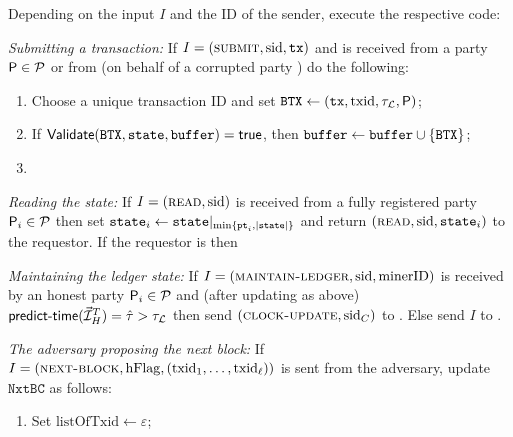 \begin{cccFunctionality}
\begin{cccEnum}
		\item Depending on the input $I$ and the ID of the sender, execute the respective code:
		\begin{cccItemize}[nosep]
			\item \emph{Submitting a transaction:}
			If $I = (\textsc{submit}, \mathrm{sid}, \mathtt{tx})$ and is received from a party $\mathsf{P} \in \mathcal{P}$ or from \adv (on behalf of a corrupted party \party) do the following:
			\begin{enumerate}[label=(\alph*), leftmargin=*, nosep]
				\item Choose a unique transaction ID \txid and set $\mathtt{BTX} \gets (\mathtt{tx}, \mathrm{txid}, \tau_\mathcal{L}, \mathsf{P})$;

				\item If $\mathsf{Validate}(\mathtt{BTX}, \mathtt{state}, \mathtt{buffer}) = \mathsf{true}$, then $\mathtt{buffer} \gets \mathtt{buffer} \cup \{ \mathtt{BTX} \}$;

				\item {}
			\end{enumerate}

			\item \emph{Reading the state:}
			If $I = (\textsc{read}, \mathrm{sid})$ is received from a fully registered party $\mathsf{P}_i \in \mathcal{P}$ then set $\mathtt{state}_i \gets \mathtt{state}|_{\min\{\mathtt{pt}_i, |\mathtt{state}|\}}$ and return $(\textsc{read}, \mathrm{sid}, \mathtt{state}_i)$ to the requestor.
			If the requestor is \adv then 

			\item \emph{Maintaining the ledger state:}
			If $I = (\textsc{maintain-ledger}, \mathrm{sid}, \mathrm{minerID})$ is received by an honest party $\mathsf{P}_i \in \mathcal{P}$ and (after updating \honestInputSeq as above) $\mathsf{predict\text{-}time}(\vec{\mathcal{I}}^T_H) = \hat{\tau} > \tau_\mathcal{L}$ then send $(\textsc{clock-update}, \mathrm{sid}_C)$ to \funcClock.
			Else send $I$ to \adv.

			\item \emph{The adversary proposing the next block:}
			If $I = (\textsc{next-block}, \mathrm{hFlag}, (\mathrm{txid}_1, \ldots , \mathrm{txid}_\ell))$ is sent from the adversary, update $\mathtt{NxtBC}$ as follows:
			\begin{enumerate}[label=(\alph*), leftmargin=*, nosep]
				\item Set $\mathrm{listOfTxid} \gets \varepsilon$;


\end{enumerate}
\end{cccItemize}
\end{cccEnum}
\end{cccFunctionality}
